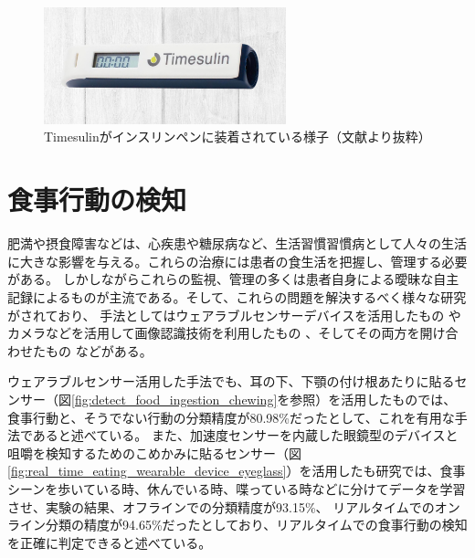 \begin{figure}[htbp]
  \caption{Timesulinがインスリンペンに装着されている様子（文献\cite{timesulin}より抜粋）}
  \label{fig:timesulin_display}
  \begin{center}
    \includegraphics[bb=0 0 600 360,width=7cm]{assets/timesulin_display.png}
  \end{center}
\end{figure}

\section{食事行動の検知}

肥満や摂食障害などは、心疾患や糖尿病など、生活習慣習慣病として人々の生活に大きな影響を与える。これらの治療には患者の食生活を把握し、管理する必要がある。
しかしながらこれらの監視、管理の多くは患者自身による曖昧な自主記録によるものが主流である。そして、これらの問題を解決するべく様々な研究がされており、
手法としてはウェアラブルセンサーデバイスを活用したもの \cite{wrist_motion_eating_detection} \cite{novel_wearable_device_monitor_ingestion} \cite{detect_eating_drinking_arm_gestures}
\cite{real_time_eating_wearable_device_eyeglass} \cite{eating_gestures_hidden_markov_models} \cite{detect_food_ingestion_chewing}や
カメラなどを活用して画像認識技術を利用したもの \cite{vb_fi_monitor_alzheimer} \cite{vb_fi_monitor_robot} \cite{vb_fi_monitor_mobile} 、そしてその両方を開け合わせたもの \cite{fi_monitor_camera_microphone} などがある。

ウェアラブルセンサー活用した手法でも、耳の下、下顎の付け根あたりに貼るセンサー（図\ref{fig:detect_food_ingestion_chewing}を参照）を活用したもの\cite{detect_food_ingestion_chewing}では、食事行動と、そうでない行動の分類精度が80.98\%だったとして、これを有用な手法であると述べている。
また、加速度センサーを内蔵した眼鏡型のデバイスと咀嚼を検知するためのこめかみに貼るセンサー（図\ref{fig:real_time_eating_wearable_device_eyeglass}）を活用したも研究\cite{real_time_eating_wearable_device_eyeglass}では、食事シーンを歩いている時、休んでいる時、喋っている時などに分けてデータを学習させ、実験の結果、オフラインでの分類精度が93.15\%、
リアルタイムでのオンライン分類の精度が94.65\%だったとしており、リアルタイムでの食事行動の検知を正確に判定できると述べている。

